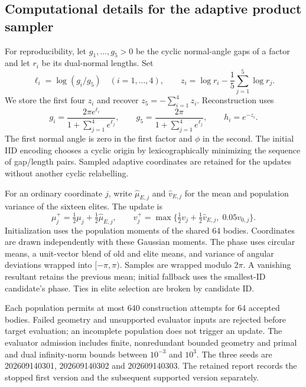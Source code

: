\subsection*{Computational details for the adaptive product sampler}

For reproducibility, let $g_1,\ldots,g_5>0$ be the cyclic normal-angle gaps
of a factor and let $r_i$ be its dual-normal lengths. Set
\[
 \ell_i=\log(g_i/g_5)\quad(i=1,\ldots,4),\qquad
 z_i=\log r_i-\frac15\sum_{j=1}^5\log r_j.
\]
We store the first four $z_i$ and recover $z_5=-\sum_{i=1}^4z_i$.
Reconstruction uses
\[
 g_i=\frac{2\pi e^{\ell_i}}{1+\sum_{j=1}^4e^{\ell_j}},\qquad
 g_5=\frac{2\pi}{1+\sum_{j=1}^4e^{\ell_j}},\qquad h_i=e^{-z_i}.
\]
The first normal angle is zero in the first factor and $\phi$ in the second.
The initial IID encoding chooses a cyclic origin by lexicographically
minimizing the sequence of gap/length pairs. Sampled adaptive coordinates
are retained for the updates without another cyclic relabelling.

For an ordinary coordinate $j$, write $\widehat\mu_{E,j}$ and
$\widehat v_{E,j}$ for the mean and population variance of the sixteen elites.
The update is
\[
 \mu_j^+=\tfrac12\mu_j+\tfrac12\widehat\mu_{E,j},\qquad
 v_j^+=\max\{\tfrac12v_j+\tfrac12\widehat v_{E,j},\;0.05v_{0,j}\}.
\]
Initialization uses the population moments of the shared 64 bodies.
Coordinates are drawn independently with these Gaussian moments. The phase
uses circular means, a unit-vector blend of old and elite means, and variance
of angular deviations wrapped into $[-\pi,\pi)$. Samples are wrapped modulo
$2\pi$. A vanishing resultant retains the previous mean; initial fallback
uses the smallest-ID candidate's phase. Ties in elite selection are broken
by candidate ID.

Each population permits at most 640 construction attempts for 64 accepted
bodies. Failed geometry and unsupported evaluator inputs are rejected before
target evaluation; an incomplete population does not trigger an update.
The evaluator admission includes finite, nonredundant bounded geometry and
primal and dual infinity-norm bounds between $10^{-3}$ and $10^3$.
The three seeds are 202609140301, 202609140302 and 202609140303. The retained
report records the stopped first version and the subsequent supported
version separately.
